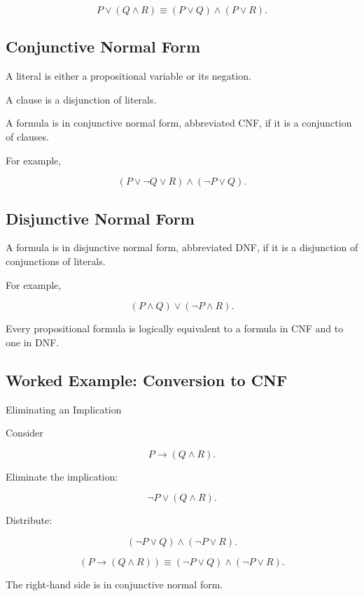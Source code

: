 \[
\boxed{
P\lor(Q\land R)
\equiv
(P\lor Q)
\land
(P\lor R).
}
\]

\subsection{Conjunctive Normal Form}
\label{subsec:conjunctive-normal-form}

A literal is either a propositional variable or its negation.

A clause is a disjunction of literals.

A formula is in conjunctive normal form, abbreviated CNF, if it is a
conjunction of clauses.

For example,

\[
\boxed{
(P\lor\neg Q\lor R)
\land
(\neg P\lor Q).
}
\]

\subsection{Disjunctive Normal Form}
\label{subsec:disjunctive-normal-form}

A formula is in disjunctive normal form, abbreviated DNF, if it is a
disjunction of conjunctions of literals.

For example,

\[
\boxed{
(P\land Q)
\lor
(\neg P\land R).
}
\]

Every propositional formula is logically equivalent to a formula in CNF
and to one in DNF.

\subsection{Worked Example: Conversion to CNF}
\label{subsec:worked-cnf}

\begin{workedexamplebox}{Eliminating an Implication}

Consider

\[
P\rightarrow(Q\land R).
\]

Eliminate the implication:

\[
\neg P\lor(Q\land R).
\]

Distribute:

\[
(\neg P\lor Q)
\land
(\neg P\lor R).
\]

\begin{answerbox}
\[
\boxed{
(P\rightarrow(Q\land R))
\equiv
(\neg P\lor Q)
\land
(\neg P\lor R).
}
\]
\end{answerbox}

The right-hand side is in conjunctive normal form.

\end{workedexamplebox}

